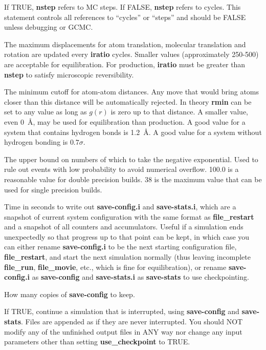 \documentclass[12pt,letterpaper]{article}
\begin{document}
 If TRUE, {\bf nstep} refers to MC
steps. If FALSE, {\bf nstep} refers to cycles. This
statement controls all references to ``cycles'' or ``steps''
and should be FALSE unless debugging or GCMC.

 The maximum displacements for atom
translation, molecular translation and rotation are updated
every {\bf iratio} cycles. Smaller values (approximately
250-500) are acceptable for equilibration. For production,
{\bf iratio} must be greater than {\bf nstep} to satisfy
microscopic reversibility.

 The minimum cutoff for atom-atom
distances. Any move that would bring atoms closer than this
distance will be automatically rejected. In theory {\bf
  rmin} can be set to any value as long as $g(r)$ is zero up
to that distance. A smaller value, even 0~{\AA}, may be used
for equilibration than production. A good value for a system
that contains hydrogen bonds is 1.2~\AA. A good value for a
system without hydrogen bonding is $0.7\sigma$.

 The upper bound on numbers of which
to take the negative exponential. Used to rule out events
with low probability to avoid numerical overflow. 100.0 is a
reasonable value for double precision builds. 38 is the
maximum value that can be used for single precision builds.

 Time in seconds to
write out {\bf save-config.i} and {\bf save-stats.i}, which
are a snapshot of current system configuration with the same
format as {\bf file\_restart} and a snapshot of all counters
and accumulators. Useful if a simulation ends unexpectedly
so that progress up to that point can be kept, in which case
you can either rename {\bf save-config.i} to be the next
starting configuration file, {\bf file\_restart}, and start
the next simulation normally (thus leaving incomplete {\bf
  file\_run}, {\bf file\_movie}, etc., which is fine for
equilibration), or rename {\bf save-config.i} as {\bf
  save-config} and {\bf save-stats.i} as {\bf save-stats} to
use checkpointing.

 How many copies of {\bf save-config} to keep.

 If TRUE, continue a
simulation that is interrupted, using {\bf save-config} and
{\bf save-stats}. Files are appended as if they are never
interrupted. You should NOT modify any of the unfinished
output files in ANY way nor change any input parameters
other than setting \textbf{use\_checkpoint} to TRUE.
\end{document}
